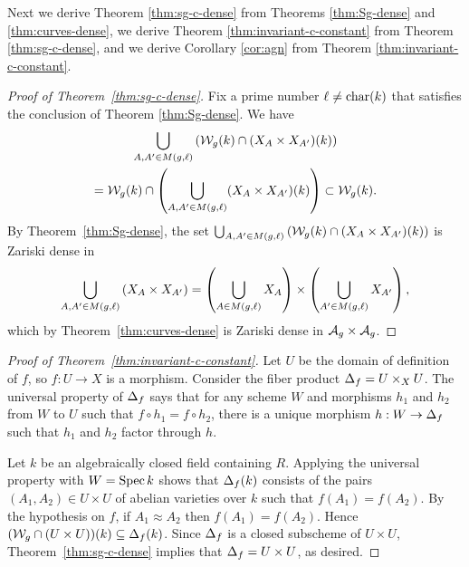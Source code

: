 \documentclass{amsart}
\begin{document}
Next we derive Theorem \ref{thm:sg-c-dense} from Theorems \ref{thm:Sg-dense} and \ref{thm:curves-dense},  we derive Theorem \ref{thm:invariant-c-constant} from Theorem \ref{thm:sg-c-dense}, and we derive Corollary \ref{cor:agn} from Theorem \ref{thm:invariant-c-constant}.

\begin{proof}[Proof of Theorem~\ref{thm:sg-c-dense}]
Fix a prime number $\ell\neq\operatorname{char}(k)$ that satisfies the conclusion of Theorem \ref{thm:Sg-dense}. We have
\begin{multline*}
\bigcup_{A,A' \in M(g,\ell)} \left(\mathcal{W}_g(k) \cap (X_A \times X_{A'})(k)\right) \\
 =  \mathcal{W}_g(k) \cap \left(\bigcup_{A,A' \in M(g,\ell)} (X_A \times X_{A'})(k)\right)
   \subset \mathcal{W}_g(k).
\end{multline*}
By Theorem~\ref{thm:Sg-dense}, the set
$\bigcup_{A,A' \in M(g,\ell)} \left(\mathcal{W}_g(k) \cap (X_A \times X_{A'})(k)\right)$ is Zariski dense in
$$
\bigcup_{A,A' \in M(g,\ell)} \left(X_A \times X_{A'}\right) =
    \left(\bigcup_{A \in M(g,\ell)} X_A\right) \times \left(\bigcup_{A' \in M(g,\ell)} X_{A'}\right),
    $$
    which by Theorem~\ref{thm:curves-dense} is Zariski dense in $\mathcal{A}_g \times \mathcal{A}_g$.
\end{proof}


\begin{proof}[Proof of Theorem~\ref{thm:invariant-c-constant}]
  Let $U$ be the domain of definition of $f$, so $f: U \to X$ is a morphism. Consider the fiber product $\Delta_f = U \times_X U$.
  The universal property of $\Delta_f$ says that for any scheme $W$ and morphisms $h_1$ and $h_2$ from $W$ to $U$ such that $f \circ h_1 = f \circ h_2$, there is a unique morphism $h: W \to \Delta_f$ such that $h_1$ and $h_2$ factor through $h$.

  Let $k$ be an algebraically closed field containing $R$.
  Applying the universal property with $W = \operatorname{Spec} k$ shows that $\Delta_f(k)$ consists of the pairs $(A_1,A_2) \in U \times U$ of abelian varieties over $k$ such that $f(A_1) = f(A_2)$.
  By the hypothesis on $f$, if $A_1 \approx A_2$ then $f(A_1) = f(A_2)$. Hence $(\mathcal{W}_g \cap (U \times U))(k) \subseteq \Delta_f(k)$.
  Since $\Delta_f$ is a closed subscheme of $U \times U$, Theorem~\ref{thm:sg-c-dense} implies that $\Delta_f = U \times U$, as desired.
\end{proof}
\end{document}
